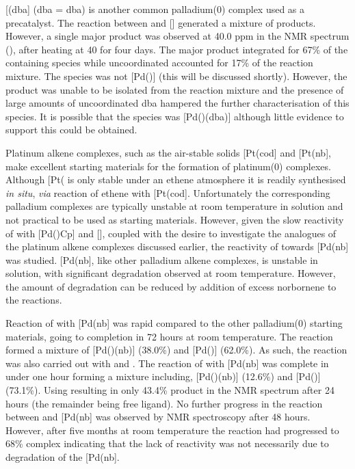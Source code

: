 [(\acrshort{dba}] (\acrshort{dba} = \acrlong{dba}) is another common palladium(0) complex used as a precatalyst.  The reaction between \tButhixantphos{} and [] generated a mixture of products.   However, a single major product was observed at 40.0 ppm in the \phosphorus{} NMR spectrum (), after heating at 40\degC{} for four days.  The major product integrated for 67\% of the \phosphorus{} containing species while uncoordinated \tButhixantphos{} accounted for 17\% of the reaction mixture.  The species was not [Pd(\tButhixantphos)] (this will be discussed shortly).  However, the product was unable to be isolated from the reaction mixture and the presence of large amounts of uncoordinated dba hampered the further characterisation of this species.  It is possible that the species was [Pd(\tButhixantphos)(dba)] although little evidence to support this could be obtained.  

Platinum alkene complexes, such as the air-stable solids [Pt(cod] and [Pt(nb], make excellent starting materials for the formation of platinum(0) complexes.\cite{Green1975b, Green1977c}  Although [Pt(\ce{C2H4)3]} is only stable under an ethene atmosphere it is readily synthesised \emph{in situ}, \emph{via} reaction of ethene with [Pt(cod].\cite{Spencer1979}  Unfortunately the corresponding palladium complexes are typically unstable at room temperature in solution and not practical to be used as starting materials.\cite{Green1977}  However, given the slow reactivity of \tButhixantphos{} with [Pd()Cp] and [], coupled with the desire to investigate the analogues of the platinum alkene complexes discussed earlier,  the reactivity of \tButhixantphos{} towards [Pd(nb] was studied.  [Pd(nb], like other palladium alkene complexes, is unstable in solution, with significant degradation observed at room temperature.\cite{Green1977}  However, the amount of degradation can be reduced by addition of excess norbornene to the reactions.

Reaction of \tButhixantphos{} with [Pd(nb] was rapid compared to the other palladium(0) starting materials, going to completion in 72 hours at room temperature.  The reaction formed a mixture of [Pd(\tButhixantphos)(nb)] (38.0\%) and [Pd(\tButhixantphos)] (62.0\%).  As such, the reaction was also carried out with \tBusixantphos{} and \tBuxantphos{}.  The reaction of \tBuxantphos{} with [Pd(nb] was complete in under one hour forming a mixture including, [Pd(\tBuxantphos)(nb)] (12.6\%) and [Pd(\tBuxantphos)] (73.1\%).  Using \tBusixantphos{} resulting in only 43.4\% product in the \phosphorus{} NMR spectrum after 24 hours (the remainder being free ligand).  No further progress in the reaction between \tBusixantphos{} and [Pd(nb] was observed by NMR spectroscopy after 48 hours.  However, after five months at room temperature the reaction had progressed to 68\% complex indicating that the lack of reactivity was not necessarily due to degradation of the [Pd(nb].  

